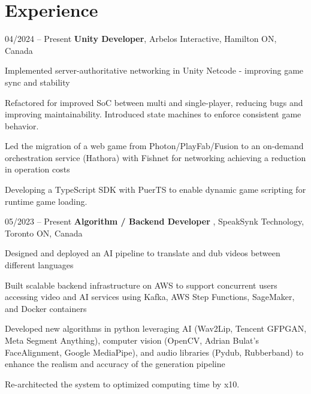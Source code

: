\section{Experience}

\begin{twocolentry}{
     04/2024 – Present
}
    \textbf{Unity Developer}, Arbelos Interactive, Hamilton ON, Canada \end{twocolentry}

\vspace{0.10 cm}
\begin{onecolentry}
    \begin{highlights}
        \item  Implemented server-authoritative networking in Unity Netcode - improving game sync and stability
        \item Refactored for improved SoC between multi and single-player, reducing bugs and improving maintainability. Introduced state machines to enforce consistent game behavior.
        \item Led the migration of a web game from Photon/PlayFab/Fusion to an on-demand orchestration service (Hathora) with Fishnet for networking achieving a reduction in operation costs
        \item Developing a TypeScript SDK with PuerTS to enable dynamic game scripting for runtime game loading.  
    \end{highlights}
\end{onecolentry}

\vspace{0.2 cm}

\begin{twocolentry}{
    05/2023 – Present
}
    \textbf{Algorithm / Backend Developer }, SpeakSynk Technology, Toronto ON, Canada\end{twocolentry}

\vspace{0.10 cm}
\begin{onecolentry}
    \begin{highlights}
        \item Designed and deployed an AI pipeline to translate and dub videos between different languages  
        \item Built scalable backend infrastructure on AWS to support concurrent users accessing video and AI services using Kafka, AWS Step Functions, SageMaker, and Docker containers 
        \item Developed new algorithms in python leveraging AI (Wav2Lip, Tencent GFPGAN, Meta Segment Anything), computer vision (OpenCV, Adrian Bulat’s FaceAlignment, Google MediaPipe), and audio libraries (Pydub, Rubberband) to enhance the realism and accuracy of the generation pipeline 
        \item Re-architected the system to optimized computing time by x10.
    \end{highlights}
\end{onecolentry}

